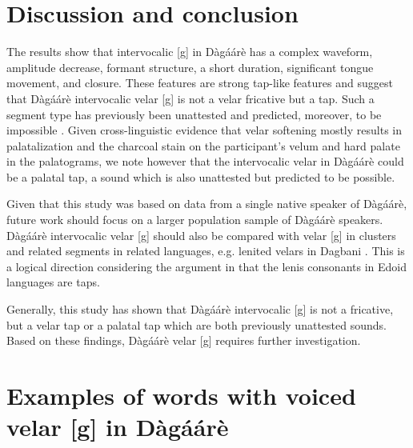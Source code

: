 \documentclass[output=paper, modfonts]{langscibook}
\begin{document}
\section{Discussion and conclusion}
The results show that intervocalic [g] in D\`ag\'a\'ar\`e has a complex waveform, amplitude decrease, formant structure, a short duration, significant tongue movement, and closure. These features are strong tap-like features and suggest that D\`ag\'a\'ar\`e intervocalic  velar [g] is not a velar fricative but a tap. Such a segment type has previously been unattested and predicted, moreover, to be impossible \citep{ladefoged1990revised}. Given cross-linguistic evidence that velar softening mostly results in palatalization \citep{halle2005palatalization} and the charcoal stain on the participant's velum and hard palate in the palatograms, we note however that the intervocalic velar in D\`ag\'a\'ar\`e could be a palatal tap, a sound which is also unattested but predicted to be possible.

Given that this study was based on data from a single native speaker of  D\`ag\'a\'ar\`e, future work should focus on a larger population sample of D\`ag\'a\'ar\`e speakers. D\`ag\'a\'ar\`e intervocalic velar [g] should also be compared with velar [g] in clusters and related segments in related languages, e.g. lenited velars in Dagbani \citep{hudu2010dagbani}. This is a logical direction considering the argument in \cite{elugbe1978wider} that the lenis consonants in Edoid languages are taps.


Generally, this study has shown that D\`ag\'a\'ar\`e intervocalic [g] is not a fricative, but a velar tap or a palatal tap which are both previously unattested sounds. Based on these findings, D\`ag\'a\'ar\`e velar [g] requires further investigation.


\section*{Examples of words with voiced velar [g] in D\`ag\'a\'ar\`e}
\end{document}
